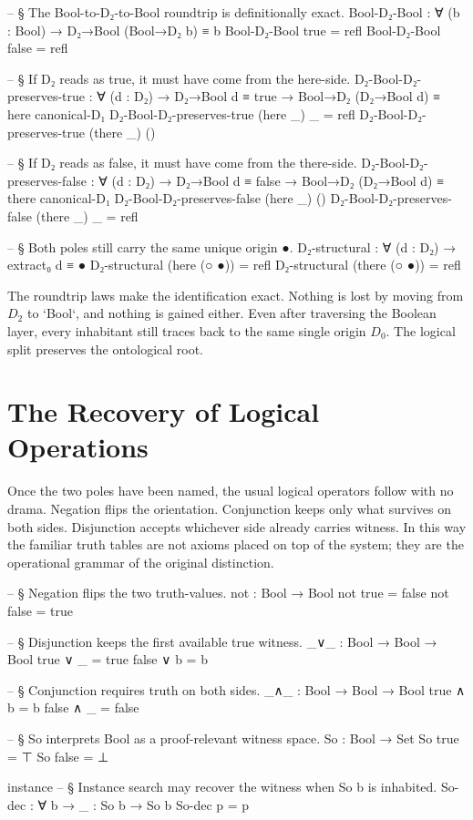 \documentclass[11pt,a4paper]{book}
\begin{document}
\begin{code}

-- § The Bool-to-D₂-to-Bool roundtrip is definitionally exact.
Bool-D₂-Bool : ∀ (b : Bool) → D₂→Bool (Bool→D₂ b) ≡ b
Bool-D₂-Bool true  = refl
Bool-D₂-Bool false = refl

-- § If D₂ reads as true, it must have come from the here-side.
D₂-Bool-D₂-preserves-true : ∀ (d : D₂) → D₂→Bool d ≡ true → 
  Bool→D₂ (D₂→Bool d) ≡ here canonical-D₁
D₂-Bool-D₂-preserves-true (here _) _ = refl
D₂-Bool-D₂-preserves-true (there _) ()

-- § If D₂ reads as false, it must have come from the there-side.
D₂-Bool-D₂-preserves-false : ∀ (d : D₂) → D₂→Bool d ≡ false → 
  Bool→D₂ (D₂→Bool d) ≡ there canonical-D₁
D₂-Bool-D₂-preserves-false (here _) ()
D₂-Bool-D₂-preserves-false (there _) _ = refl

-- § Both poles still carry the same unique origin ●.
D₂-structural : ∀ (d : D₂) → extract₀ d ≡ ●
D₂-structural (here (○ ●))  = refl
D₂-structural (there (○ ●)) = refl
\end{code}

The roundtrip laws make the identification exact. Nothing is lost by moving from $D_2$ to `Bool`, and nothing is gained either. Even after traversing the Boolean layer, every inhabitant still traces back to the same single origin $D_0$. The logical split preserves the ontological root.

\section{The Recovery of Logical Operations}

Once the two poles have been named, the usual logical operators follow with no drama. Negation flips the orientation. Conjunction keeps only what survives on both sides. Disjunction accepts whichever side already carries witness. In this way the familiar truth tables are not axioms placed on top of the system; they are the operational grammar of the original distinction.

\begin{code}

-- § Negation flips the two truth-values.
not : Bool → Bool
not true = false
not false = true

-- § Disjunction keeps the first available true witness.
_∨_ : Bool → Bool → Bool
true  ∨ _ = true
false ∨ b = b

-- § Conjunction requires truth on both sides.
_∧_ : Bool → Bool → Bool
true ∧ b = b
false ∧ _ = false

-- § So interprets Bool as a proof-relevant witness space.
So : Bool → Set
So true  = ⊤
So false = ⊥

instance
  -- § Instance search may recover the witness when So b is inhabited.
  So-dec : ∀ {b} → {{_ : So b}} → So b
  So-dec {{p}} = p
\end{code}
\end{document}
